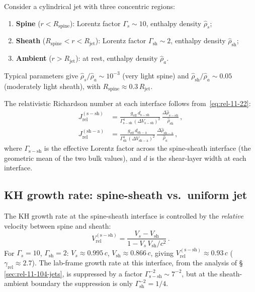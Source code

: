Consider a cylindrical jet with three concentric regions:
\begin{enumerate}
\item \textbf{Spine} ($r < R_{\mathrm{spine}}$): Lorentz factor
  $\Gamma_{s} \sim 10$, enthalpy density $\hat{\rho}_{s}$;
\item \textbf{Sheath} ($R_{\mathrm{spine}} < r < R_{\mathrm{jet}}$):
  Lorentz factor $\Gamma_{\mathrm{sh}} \sim 2$, enthalpy density
  $\hat{\rho}_{\mathrm{sh}}$;
\item \textbf{Ambient} ($r > R_{\mathrm{jet}}$): at rest,
  enthalpy density $\hat{\rho}_{a}$.
\end{enumerate}
Typical parameters give $\hat{\rho}_{s}/\hat{\rho}_{a} \sim 10^{-3}$
(very light spine) and $\hat{\rho}_{\mathrm{sh}}/\hat{\rho}_{a} \sim 0.05$
(moderately light sheath), with $R_{\mathrm{spine}} \approx 0.3\,R_{\mathrm{jet}}$.

The relativistic Richardson number at each interface follows
from~\eqref{eq:rel-11-22}:
\begin{align}
  J_{\mathrm{rel}}^{(\mathrm{s-sh})}
  &= \frac{g_{\mathrm{eff}}\,d_{\mathrm{s-sh}}}
  {\Gamma_{\mathrm{s-sh}}^{4}\,(\Delta V_{\mathrm{s-sh}})^{2}}\,
  \frac{\Delta\hat{\rho}_{\mathrm{s-sh}}}{\hat{\rho}_{\mathrm{sh}}}\,,
  \label{eq:rel-Ri-spine-sheath} \\
  J_{\mathrm{rel}}^{(\mathrm{sh-a})}
  &= \frac{g_{\mathrm{eff}}\,d_{\mathrm{sh-a}}}
  {\Gamma_{\mathrm{sh}}^{4}\,(\Delta V_{\mathrm{sh-a}})^{2}}\,
  \frac{\Delta\hat{\rho}_{\mathrm{sh-a}}}{\hat{\rho}_{a}}\,,
  \label{eq:rel-Ri-sheath-amb}
\end{align}
where $\Gamma_{\mathrm{s-sh}}$ is the effective Lorentz factor across
the spine-sheath interface (the geometric mean of the two bulk values),
and $d$ is the shear-layer width at each interface.

\subsection{KH growth rate: spine-sheath vs.\ uniform jet}
\label{sec:rel-102-103-spine-sheath-growth}

The KH growth rate at the spine-sheath interface is controlled by
the \emph{relative} velocity between spine and sheath:
\begin{equation}
  V_{\mathrm{rel}}^{(\mathrm{s-sh})}
  = \frac{V_{s} - V_{\mathrm{sh}}}{1 - V_{s}\,V_{\mathrm{sh}}/c^{2}}\,.
\end{equation}
For $\Gamma_{s} = 10$, $\Gamma_{\mathrm{sh}} = 2$:
$V_{s} \approx 0.995\,c$, $V_{\mathrm{sh}} \approx 0.866\,c$,
giving $V_{\mathrm{rel}}^{(\mathrm{s-sh})} \approx 0.93\,c$
($\gamma_{\mathrm{rel}} \approx 2.7$).  The lab-frame growth rate
at this interface, from the analysis of \S\,\ref{sec:rel-11-104-jets},
is suppressed by a factor $\Gamma_{\mathrm{s-sh}}^{-2} \sim 7^{-2}$,
but at the sheath-ambient boundary the suppression is only
$\Gamma_{\mathrm{sh}}^{-2} = 1/4$.

